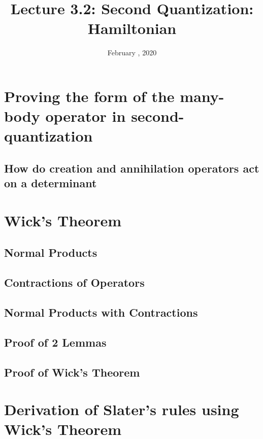 \documentclass{article}
\title{Lecture 3.2:  Second Quantization: Hamiltonian}
\date{February , 2020}
\begin{document}
\maketitle
\noindent
\section{Proving the form of the many-body operator in second-quantization}
\subsection{How do creation and annihilation operators act on a determinant }
\section{Wick's Theorem}
\subsection{Normal Products}
\subsection{Contractions of Operators}
\subsection{Normal Products with Contractions}
\subsection{Proof of 2 Lemmas}
\subsection{Proof of Wick's Theorem}
\section{Derivation of Slater's rules using Wick's Theorem}
\end{document}
